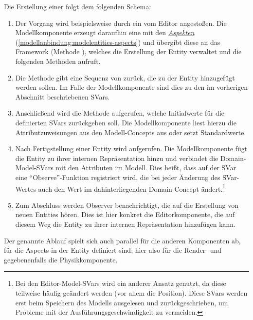 \documentclass[a4paper,10pt]{sphinxmanual}
\begin{document}
Die Erstellung einer  folgt dem folgenden Schema:
\begin{enumerate}
\item {} 
Der Vorgang wird beispielsweise durch ein  vom Editor angestoßen. Die Modellkomponente erzeugt daraufhin eine  mit den {\hyperref[modellanbindung:modelentities-aspects]{\emph{Aspekten}}} (\autoref*{modellanbindung:modelentities-aspects}) und übergibt diese an das Framework (Methode ), welches die Erstellung der Entity verwaltet und die folgenden Methoden aufruft.

\item {} 
Die Methode  gibt eine Sequenz von  zurück, die zu der Entity hinzugefügt werden sollen. Im Falle der Modellkomponente sind dies  zu den im vorherigen Abschnitt beschriebenen SVars.

\item {} 
Anschließend wird die Methode  aufgerufen, welche Initialwerte für die definierten SVars zurückgeben soll. Die Modellkomponente liest hierzu die Attributzuweisungen aus den Modell-Concepts aus oder setzt Standardwerte.

\item {} 
Nach Fertigstellung einer Entity wird  aufgerufen. Die Modellkomponente fügt die Entity zu ihrer internen Repräsentation hinzu und verbindet die Domain-Model-SVars mit den Attributen im Modell. Dies heißt, dass auf der SVar eine "`Observe"'-Funktion registriert wird, die bei jeder Änderung des SVar-Wertes auch den Wert im dahinterliegenden Domain-Concept ändert.\footnote{
Bei den Editor-Model-SVars wird ein anderer Ansatz genutzt, da diese teilweise häufig geändert werden (vor allem die Position). Diese SVars werden erst beim Speichern des Modells ausgelesen und zurückgeschrieben, um Probleme mit der Ausführungsgeschwindigkeit zu vermeiden.
}

\item {} 
Zum Abschluss werden Observer benachrichtigt, die auf die Erstellung von neuen Entities hören. Dies ist hier konkret die Editorkomponente, die auf diesem Weg die Entity zu ihrer internen Repräsentation hinzufügen kann.

\end{enumerate}

Der genannte Ablauf spielt sich auch parallel für die anderen Komponenten ab, für die Aspects in der Entity definiert sind; hier also für die Render- und gegebenenfalls die Physikkomponente.
\end{document}
